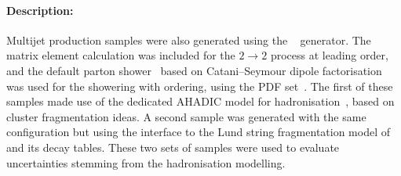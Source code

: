 \paragraph{Description:}

Multijet production samples were also generated using the \SHERPA[2.2.5]~\cite{Bothmann:2019yzt} generator.
The matrix element calculation was included for the \(2\rightarrow2\) process at leading order, and the default \SHERPA parton
shower~\cite{Schumann:2007mg} based on Catani--Seymour dipole factorisation was used for the showering with \pT
ordering, using the \CT[14nnlo] PDF set~\cite{Dulat:2015mca}.
The first of these samples made use of the dedicated \SHERPA AHADIC model for hadronisation~\cite{Winter:2003tt},
based on cluster fragmentation ideas. A second sample was generated with the same configuration but using the \SHERPA interface to
the Lund string fragmentation model of \PYTHIA[6]~\cite{Sjostrand:2006za} and its decay tables.
These two sets of samples were used to evaluate uncertainties stemming from the hadronisation modelling.

